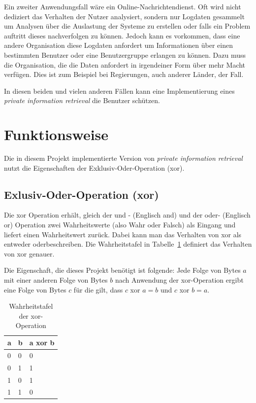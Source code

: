 \documentclass[]{article}
\begin{document}
Ein zweiter Anwendungsfall wäre ein Online-Nachrichtendienst. Oft wird nicht dediziert das Verhalten der Nutzer analysiert, sondern nur Logdaten gesammelt um Analysen über die Auslastung der Systeme zu erstellen oder falls ein Problem auftritt dieses nachverfolgen zu können. Jedoch kann es vorkommen, dass eine andere Organisation diese Logdaten anfordert um Informationen über einen bestimmten Benutzer oder eine Benutzergruppe erlangen zu können. Dazu muss die Organisation, die die Daten anfordert in irgendeiner Form über mehr Macht verfügen. Dies ist zum Beispiel bei Regierungen, auch anderer Länder, der Fall.

In diesen beiden und vielen anderen Fällen kann eine Implementierung eines \textit{private information retrieval} die Benutzer schützen.

\section{Funktionsweise}
Die in diesem Projekt implementierte Version von \textit{private information retrieval} nutzt die Eigenschaften der Exklusiv-Oder-Operation (xor).

\subsection{Exlusiv-Oder-Operation (xor)}
Die xor Operation erhält, gleich der \glqq und \grqq - (Englisch \glqq and\grqq) und der \glqq oder\grqq - (Englisch \glqq or\grqq ) Operation zwei Wahrheitswerte (also Wahr oder Falsch) als Eingang und liefert einen Wahrheitswert zurück. Dabei kann man das Verhalten von xor als \glqq entweder oder\grqq beschreiben. Die Wahrheitstafel in Tabelle~\ref{tab:wahrheitstafel_xor} definiert das Verhalten von xor genauer.

Die Eigenschaft, die dieses Projekt benötigt ist folgende: Jede Folge von Bytes $a$ mit einer anderen Folge von Bytes $b$ nach Anwendung der xor-Operation ergibt eine Folge von Bytes $c$ für die gilt, dass $c$ xor $a = b$ und $c$ xor $b = a$.

\begin{table}[]
	\centering
	\begin{tabular}{|l|l|l|}
		\hline
		\textbf{a} & \textbf{b} & \textbf{a xor b} \\ \hline
		0          & 0          & 0                \\ \hline
		0          & 1          & 1                \\ \hline
		1          & 0          & 1                \\ \hline
		1          & 1          & 0                \\ \hline
	\end{tabular}
	\caption{Wahrheitstafel der xor-Operation}
	\label{tab:wahrheitstafel_xor}
\end{table}
\end{document}
